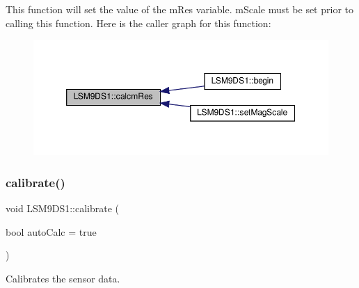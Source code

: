 This function will set the value of the m\+Res variable. m\+Scale must be set prior to calling this function. Here is the caller graph for this function\+:
\nopagebreak
\begin{figure}[H]
\begin{center}
\leavevmode
\includegraphics[width=350pt]{classLSM9DS1_a830dfc95c7e2d8524720d78357b053cb_icgraph}
\end{center}
\end{figure}
\mbox{\label{classLSM9DS1_a97939cb15fcb7e33abcd6d3a9230d943}} 
\subsubsection{\texorpdfstring{calibrate()}{calibrate()}}
{\footnotesize\ttfamily void L\+S\+M9\+D\+S1\+::calibrate (\begin{DoxyParamCaption}\item[{bool}]{auto\+Calc = {\ttfamily true} }\end{DoxyParamCaption})}



Calibrates the sensor data. 


